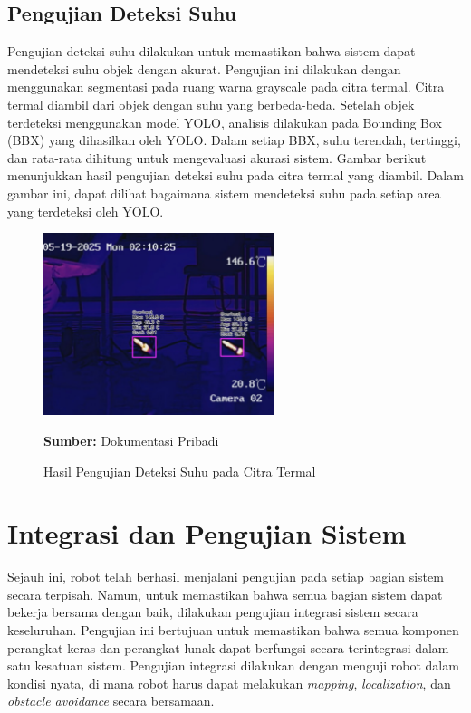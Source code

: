 \subsection{Pengujian Deteksi Suhu}

Pengujian deteksi suhu dilakukan untuk memastikan bahwa sistem dapat mendeteksi suhu objek dengan akurat. Pengujian ini dilakukan dengan menggunakan segmentasi pada ruang warna grayscale pada citra termal. Citra termal diambil dari objek dengan suhu yang berbeda-beda. Setelah objek terdeteksi menggunakan model YOLO, analisis dilakukan pada Bounding Box (BBX) yang dihasilkan oleh YOLO. Dalam setiap BBX, suhu terendah, tertinggi, dan rata-rata dihitung untuk mengevaluasi akurasi sistem. Gambar berikut menunjukkan hasil pengujian deteksi suhu pada citra termal yang diambil. Dalam gambar ini, dapat dilihat bagaimana sistem mendeteksi suhu pada setiap area yang terdeteksi oleh YOLO.

\begin{figure}[H]
    \centering
    \includegraphics[width=0.6\textwidth]{gambar/bab4/deteksi-suhu.png}
    \caption{Hasil Pengujian Deteksi Suhu pada Citra Termal}
    \label{fig:deteksi_suhu}
    \footnotesize{\textbf{Sumber:} Dokumentasi Pribadi}
\end{figure}


\section{Integrasi dan Pengujian Sistem}
Sejauh ini, robot telah berhasil menjalani pengujian pada setiap bagian sistem secara terpisah. Namun, untuk memastikan bahwa semua bagian sistem dapat bekerja bersama dengan baik, dilakukan pengujian integrasi sistem secara keseluruhan. Pengujian ini bertujuan untuk memastikan bahwa semua komponen perangkat keras dan perangkat lunak dapat berfungsi secara terintegrasi dalam satu kesatuan sistem. Pengujian integrasi dilakukan dengan menguji robot dalam kondisi nyata, di mana robot harus dapat melakukan \emph{mapping}, \emph{localization}, dan \emph{obstacle avoidance} secara bersamaan.

